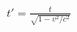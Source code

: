 \documentclass[preview]{standalone}
\begin{document}
\begin{align*}
t' = \frac{t}{\sqrt{1 - v^2/c^2}}
\end{align*}
\end{document}

